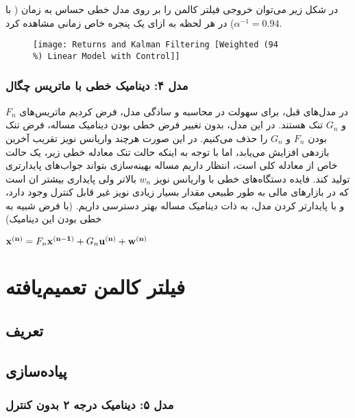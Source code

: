 \documentclass{scribe-cgenomics}
\begin{document}
\begin{نتیجه}
در شکل زیر می‌توان خروجی فیلتر کالمن را بر روی مدل خطی حساس به زمان ( با
$\alpha^{-1} = 0.94$)
در هر لحظه به ازای یک پنجره خاص زمانی مشاهده کرد.

\begin{figure}[h]
\texttt{[image: Returns and Kalman Filtering [Weighted (94\\\%) Linear Model with Control]]}
\centering
\end{figure}
\end{نتیجه}





\subsubsection{مدل ۴: دینامیک خطی با ماتریس چگال}
در مدل‌های قبل، برای سهولت در محاسبه و سادگی مدل، فرض کردیم ماتریس‌های
$F_n$
و
$G_n$
تنک هستند. در این مدل، بدون تغییر فرض خطی بودن دینامیک مساله، فرض تنک بودن
$F_n$
و
$G_n$
را حذف می‌کنیم. در این صورت هرچند واریانس نویز تقریب آخرین بازدهی افزایش می‌یابد، اما با توجه به اینکه حالت تنک معادله خطی زیر، یک حالت خاص از معادله کلی است، انتظار داریم مساله بهینه‌سازی بتواند جواب‌های پایدارتری تولید کند. فایده دستگاه‌های خطی با واریانس نویز
$w_n$
بالاتر ولی پایداری بیشتر ان است که در بازارهای مالی به طور طبیعی مقدار بسیار زیادی نویز غیر قابل کنترل وجود دارد، و با پایدارتر کردن مدل، به ذات دینامیک مساله بهتر دسترسی داریم. (با فرض شبیه به خطی بودن این دینامیک)

\begin{center}
$
\bold{x^{(n)}} = F_n\bold{x^{(n-1)}} + G_n\bold{u^{(n)}} + \bold{w^{(n)}}
$
\end{center}




\section{فیلتر کالمن تعمیم‌یافته}

\subsection{تعریف}
\subsection{پیاده‌سازی}
\subsubsection{مدل ۵: دینامیک درجه ۲ بدون کنترل}
\end{document}

